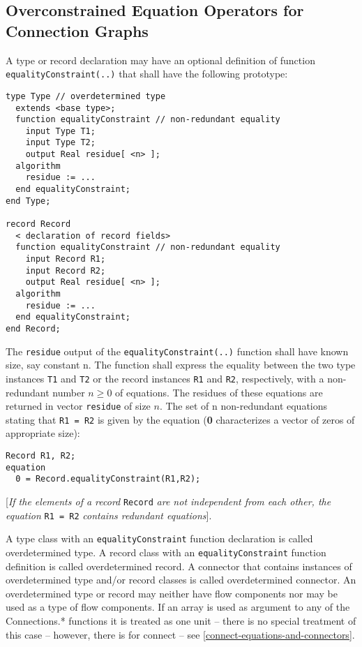 \subsection{Overconstrained Equation Operators for Connection Graphs}

A type or record declaration may have an optional definition of function
\lstinline!equalityConstraint(..)! that shall have the following prototype:

\begin{lstlisting}[language=modelica]
type Type // overdetermined type
  extends <base type>;
  function equalityConstraint // non-redundant equality
    input Type T1;
    input Type T2;
    output Real residue[ <n> ];
  algorithm
    residue := ...
  end equalityConstraint;
end Type;

record Record
  < declaration of record fields>
  function equalityConstraint // non-redundant equality
    input Record R1;
    input Record R2;
    output Real residue[ <n> ];
  algorithm
    residue := ...
  end equalityConstraint;
end Record;
\end{lstlisting}
The \lstinline!residue! output of the \lstinline!equalityConstraint(..)! function shall have
known size, say constant n. The function shall express the equality
between the two type instances \lstinline!T1! and \lstinline!T2! or the record instances
\lstinline!R1! and
\lstinline!R2!, respectively, with a non-redundant number $n \ge 0$ of equations. The
residues of these equations are returned in vector \lstinline!residue! of size
$n$. The set of n non-redundant equations stating that \lstinline!R1 = R2! is given by
the equation (\textbf{0} characterizes a vector of zeros of appropriate
size):

\begin{lstlisting}[language=modelica]
  Record R1, R2;
equation
  0 = Record.equalityConstraint(R1,R2);
\end{lstlisting}
{[}\emph{If the elements of a record} \lstinline!Record! \emph{are not independent
from each other, the equation} \lstinline!R1 = R2! \emph{contains redundant
equations}{]}.

A type class with an \lstinline!equalityConstraint! function declaration is called
overdetermined type. A record class with an \lstinline!equalityConstraint! function
definition is called overdetermined record. A connector that contains
instances of overdetermined type and/or record classes is called
overdetermined connector. An overdetermined type or record may neither
have flow components nor may be used as a type of flow components. If an
array is used as argument to any of the Connections.* functions it is
treated as one unit -- there is no special treatment of this case --
however, there is for connect -- see \autoref{connect-equations-and-connectors}.

